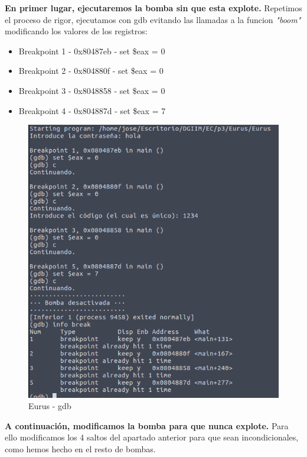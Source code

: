 \documentclass[11pt,a4paper]{article}
\begin{document}
\textbf{En primer lugar, ejecutaremos la bomba sin que esta explote.} Repetimos el proceso de rigor, ejecutamos con gdb evitando las llamadas a la funcion \emph{"boom"} modificando los valores de los registros: 

\begin{itemize}
	\item Breakpoint 1 - 0x80487eb - set \$eax = 0
	\item Breakpoint 2 - 0x804880f - set \$eax = 0
	\item Breakpoint 3 - 0x8048858 - set \$eax = 0
	\item Breakpoint 4 - 0x804887d - set \$eax = 7
\end{itemize}

\begin{figure}[H] 
	\centering
	\includegraphics[scale=0.45]{capturas/Eurus1.png} 
	\caption{Eurus - gdb} \label{fig:figura25}
\end{figure}

\textbf{A continuación, modificamos la bomba para que nunca explote.} Para ello modificamos los 4 saltos del apartado anterior para que sean incondicionales, como hemos hecho en el resto de bombas. \\
\end{document}
